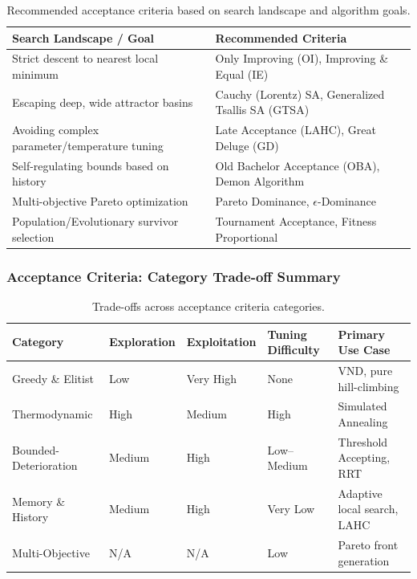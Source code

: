 \documentclass{article}
\begin{document}
\begin{table}[H]
    \centering
    \caption{Recommended acceptance criteria based on search landscape and algorithm goals.}
    \begin{tabularx}{\textwidth}{@{} l X @{}}
        \toprule
        \textbf{Search Landscape / Goal} & \textbf{Recommended Criteria} \\
        \midrule
        Strict descent to nearest local minimum & Only Improving (OI), Improving \& Equal (IE) \\
        Escaping deep, wide attractor basins & Cauchy (Lorentz) SA, Generalized Tsallis SA (GTSA) \\
        Avoiding complex parameter/temperature tuning & Late Acceptance (LAHC), Great Deluge (GD) \\
        Self-regulating bounds based on history & Old Bachelor Acceptance (OBA), Demon Algorithm \\
        Multi-objective Pareto optimization & Pareto Dominance, $\epsilon$-Dominance \\
        Population/Evolutionary survivor selection & Tournament Acceptance, Fitness Proportional \\
        \bottomrule
    \end{tabularx}
\end{table}

\subsubsection*{Acceptance Criteria: Category Trade-off Summary}

\begin{table}[H]
    \centering
    \caption{Trade-offs across acceptance criteria categories.}
    \begin{tabularx}{\textwidth}{@{} X l l l X @{}}
        \toprule
        \textbf{Category} & \textbf{Exploration} & \textbf{Exploitation} & \textbf{Tuning Difficulty} & \textbf{Primary Use Case} \\
        \midrule
        Greedy \& Elitist & Low & Very High & None & VND, pure hill-climbing \\
        Thermodynamic & High & Medium & High & Simulated Annealing \\
        Bounded-Deterioration& Medium & High & Low--Medium & Threshold Accepting, RRT \\
        Memory \& History & Medium & High & Very Low & Adaptive local search, LAHC \\
        Multi-Objective & N/A & N/A & Low & Pareto front generation \\
        \bottomrule
    \end{tabularx}
\end{table}
\end{document}
